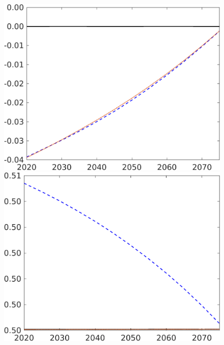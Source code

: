 \begin{figure}[h!!]
\begin{minipage}[]{0.32\textwidth}
\end{minipage}
	\begin{minipage}[]{0.32\textwidth}
	\includegraphics[width=1\textwidth]{../../codding_model/own_basedOnFried/optimalPol_elastS_DisuSci/figures/all_1705/tauf_CompEffOPT_NOT_NoTaus_spillover0_sep1_BN0_ineq0_red0_etaa0.79_lgd0.png}
\end{minipage}
	\begin{minipage}[]{0.32\textwidth}
		\includegraphics[width=1\textwidth]{../../codding_model/own_basedOnFried/optimalPol_elastS_DisuSci/figures/all_1705/hh_CompEffOPT_NOT_NoTaus_spillover0_sep1_BN0_ineq0_red0_etaa0.79_lgd0.png}

\end{minipage}
\end{figure}
